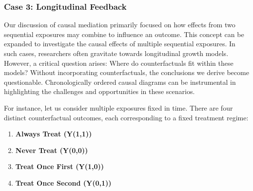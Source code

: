 \documentclass[
  singlecolumn,
  9pt]{article}
\providecommand{\tightlist}{%
  \setlength{\itemsep}{0pt}\setlength{\parskip}{0pt}}\usepackage{longtable,booktabs,array}
\begin{document}
\subsubsection{Case 3: Longitudinal
Feedback}\label{case-3-longitudinal-feedback}

Our discussion of causal mediation primarily focused on how effects from
two sequential exposures may combine to influence an outcome. This
concept can be expanded to investigate the causal effects of multiple
sequential exposures. In such cases, researchers often gravitate towards
longitudinal growth models. However, a critical question arises: Where
do counterfactuals fit within these models? Without incorporating
counterfactuals, the conclusions we derive become questionable.
Chronologically ordered causal diagrams can be instrumental in
highlighting the challenges and opportunities in these scenarios.

For instance, let us consider multiple exposures fixed in time. There
are four distinct counterfactual outcomes, each corresponding to a fixed
treatment regime:

\begin{enumerate}
\def\labelenumi{\arabic{enumi}.}
\tightlist
\item
  \textbf{Always Treat (Y(1,1))}
\item
  \textbf{Never Treat (Y(0,0))}
\item
  \textbf{Treat Once First (Y(1,0))}
\item
  \textbf{Treat Once Second (Y(0,1))}
\end{enumerate}
\end{document}
